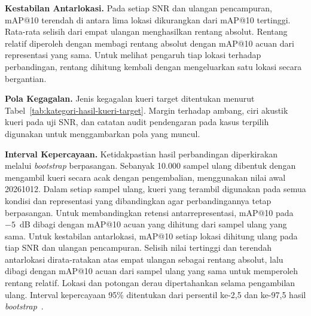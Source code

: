 \textbf{Kestabilan Antarlokasi.} Pada setiap SNR dan ulangan pencampuran, mAP@10 terendah di antara lima lokasi dikurangkan dari mAP@10 tertinggi. Rata-rata selisih dari empat ulangan menghasilkan rentang absolut. Rentang relatif diperoleh dengan membagi rentang absolut dengan mAP@10 acuan dari representasi yang sama. Untuk melihat pengaruh tiap lokasi terhadap perbandingan, rentang dihitung kembali dengan mengeluarkan satu lokasi secara bergantian.

\textbf{Pola Kegagalan.} Jenis kegagalan kueri target ditentukan menurut Tabel~\ref{tab:kategori-hasil-kueri-target}. Margin terhadap ambang, ciri akustik kueri pada uji SNR, dan catatan audit pendengaran pada kasus terpilih digunakan untuk menggambarkan pola yang muncul.

\textbf{Interval Kepercayaan.} Ketidakpastian hasil perbandingan diperkirakan melalui \textit{bootstrap} berpasangan. Sebanyak 10.000 sampel ulang dibentuk dengan mengambil kueri secara acak dengan pengembalian, menggunakan nilai awal 20261012. Dalam setiap sampel ulang, kueri yang terambil digunakan pada semua kondisi dan representasi yang dibandingkan agar perbandingannya tetap berpasangan. Untuk membandingkan retensi antarrepresentasi, mAP@10 pada $-5$~dB dibagi dengan mAP@10 acuan yang dihitung dari sampel ulang yang sama. Untuk kestabilan antarlokasi, mAP@10 setiap lokasi dihitung ulang pada tiap SNR dan ulangan pencampuran. Selisih nilai tertinggi dan terendah antarlokasi dirata-ratakan atas empat ulangan sebagai rentang absolut, lalu dibagi dengan mAP@10 acuan dari sampel ulang yang sama untuk memperoleh rentang relatif. Lokasi dan potongan derau dipertahankan selama pengambilan ulang. Interval kepercayaan 95\% ditentukan dari persentil ke-2{,}5 dan ke-97{,}5 hasil \textit{bootstrap}~\cite{rousselet2021bootstrap}.
